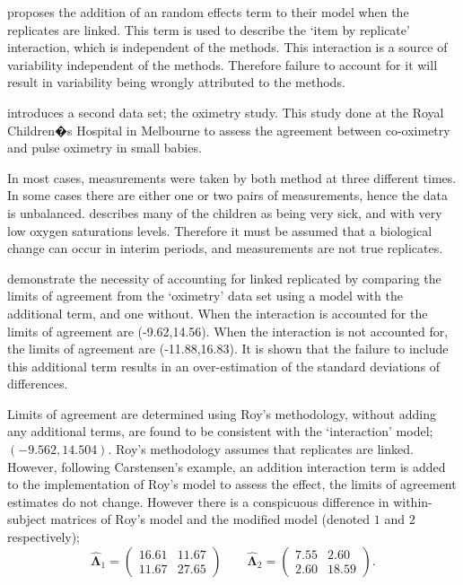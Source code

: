 \documentclass[12pt, a4paper]{report}
\theoremstyle{plain}
\theoremstyle{definition}
\theoremstyle{remark}
\begin{document}
\citet{BXC2008} proposes the addition of an random effects term to their model when the replicates are linked. This term is used to describe the `item by replicate' interaction, which is independent of the methods. This interaction is a source of variability independent of the methods. Therefore failure to account for it will result in variability being wrongly attributed to the methods.

\citet{BXC2008} introduces a second data set; the oximetry study. This study done at the Royal Children�s Hospital in
Melbourne to assess the agreement between co-oximetry and pulse oximetry in small babies.

In most cases, measurements were taken by both method at three different times. In some cases there are either one or two pairs of measurements, hence the data is unbalanced. \citet{BXC2008} describes many of the children as being very sick, and with very low oxygen saturations levels. Therefore it must be assumed that a biological change can occur in interim periods, and measurements are not true replicates.

\citet{BXC2008} demonstrate the necessity of accounting for linked replicated by comparing the limits of agreement from the `oximetry' data set using a model with the additional term, and one without. When the interaction is accounted for the limits of agreement are (-9.62,14.56). When the interaction is not accounted for, the limits of agreement are (-11.88,16.83). It is shown that the failure to include this additional term results in an over-estimation of the standard deviations of differences.

Limits of agreement are determined using Roy's methodology, without adding any additional terms, are found to be consistent with the `interaction' model; $(-9.562, 14.504 )$. Roy's methodology assumes that replicates are linked. However, following Carstensen's example, an addition interaction term is added to the implementation of Roy's model to assess the effect, the limits of agreement estimates do not change. However there is a conspicuous difference in within-subject matrices of Roy's model and the modified model (denoted $1$ and $2$ respectively);
\begin{equation}
\hat{\boldsymbol{\Lambda}}_{1}= \left(\begin{array}{cc}
 16.61 &	11.67\\
11.67 & 27.65 \end{array}\right) \qquad
\boldsymbol{\hat{\Lambda}}_{2}= \left( \begin{array}{cc}
    7.55 & 2.60 \\
    2.60 & 18.59 \end{array} \right). 
\end{equation}
\end{document}

